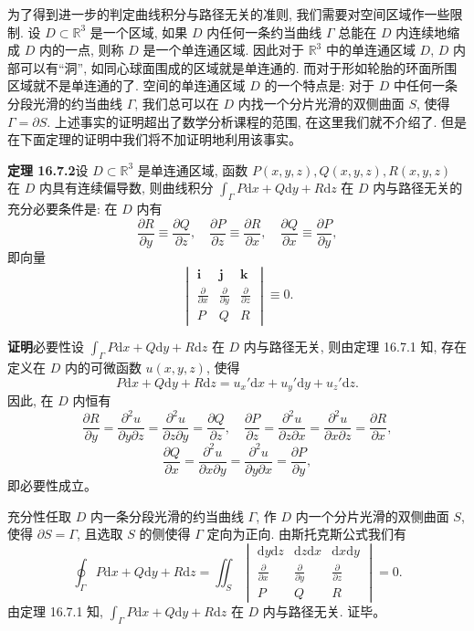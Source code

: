 \documentclass[UTF8, 12pt, fontset=fandol, oneside]{ctexart}
\begin{document}
为了得到进一步的判定曲线积分与路径无关的准则, 我们需要对空间区域作一些限制. 设 $D\subset\mathbb R^3$ 是一个区域, 如果 $D$ 内任何一条约当曲线 $\Gamma$ 总能在 $D$ 内连续地缩成 $D$ 内的一点, 则称 $D$ 是一个单连通区域. 因此对于 $\mathbb R^3$ 中的单连通区域 $D$, $D$ 内部可以有“洞”, 如同心球面围成的区域就是单连通的. 而对于形如轮胎的环面所围区域就不是单连通的了. 空间的单连通区域 $D$ 的一个特点是: 对于 $D$ 中任何一条分段光滑的约当曲线 $\Gamma$, 我们总可以在 $D$ 内找一个分片光滑的双侧曲面 $S$, 使得 $\Gamma=\partial S$. 上述事实的证明超出了数学分析课程的范围, 在这里我们就不介绍了. 但是在下面定理的证明中我们将不加证明地利用该事实。

\noindent\textbf{定理 16.7.2}\quad 设 $D\subset\mathbb R^3$ 是单连通区域, 函数 $P(x,y,z),Q(x,y,z),R(x,y,z)$ 在 $D$ 内具有连续偏导数, 则曲线积分 $\int_\Gamma P\mathrm dx+Q\mathrm dy+R\mathrm dz$ 在 $D$ 内与路径无关的充分必要条件是: 在 $D$ 内有
\[
  \frac{\partial R}{\partial y}\equiv\frac{\partial Q}{\partial z},
  \quad
  \frac{\partial P}{\partial z}\equiv\frac{\partial R}{\partial x},
  \quad
  \frac{\partial Q}{\partial x}\equiv\frac{\partial P}{\partial y},
\]
即向量
\[
  \begin{vmatrix}
    \boldsymbol i&\boldsymbol j&\boldsymbol k\\
    \frac{\partial}{\partial x}&\frac{\partial}{\partial y}&\frac{\partial}{\partial z}\\
    P&Q&R
  \end{vmatrix}
  \equiv0.
\]

\noindent\textbf{证明}\quad 必要性\quad 设 $\int_\Gamma P\mathrm dx+Q\mathrm dy+R\mathrm dz$ 在 $D$ 内与路径无关, 则由定理 16.7.1 知, 存在定义在 $D$ 内的可微函数 $u(x,y,z)$, 使得
\[
  P\mathrm dx+Q\mathrm dy+R\mathrm dz=u_x'\mathrm dx+u_y'\mathrm dy+u_z'\mathrm dz.
\]
因此, 在 $D$ 内恒有
\[
  \frac{\partial R}{\partial y}
  =\frac{\partial^2u}{\partial y\partial z}
  =\frac{\partial^2u}{\partial z\partial y}
  =\frac{\partial Q}{\partial z},
  \quad
  \frac{\partial P}{\partial z}
  =\frac{\partial^2u}{\partial z\partial x}
  =\frac{\partial^2u}{\partial x\partial z}
  =\frac{\partial R}{\partial x},
\]
\[
  \frac{\partial Q}{\partial x}
  =\frac{\partial^2u}{\partial x\partial y}
  =\frac{\partial^2u}{\partial y\partial x}
  =\frac{\partial P}{\partial y},
\]
即必要性成立。

充分性\quad 任取 $D$ 内一条分段光滑的约当曲线 $\Gamma$, 作 $D$ 内一个分片光滑的双侧曲面 $S$, 使得 $\partial S=\Gamma$, 且选取 $S$ 的侧使得 $\Gamma$ 定向为正向. 由斯托克斯公式我们有
\[
  \oint_\Gamma P\mathrm dx+Q\mathrm dy+R\mathrm dz
  =
  \iint_S
  \begin{vmatrix}
    \mathrm dy\mathrm dz&\mathrm dz\mathrm dx&\mathrm dx\mathrm dy\\
    \frac{\partial}{\partial x}&\frac{\partial}{\partial y}&\frac{\partial}{\partial z}\\
    P&Q&R
  \end{vmatrix}
  =0.
\]
由定理 16.7.1 知, $\int_\Gamma P\mathrm dx+Q\mathrm dy+R\mathrm dz$ 在 $D$ 内与路径无关. 证毕。
\end{document}
